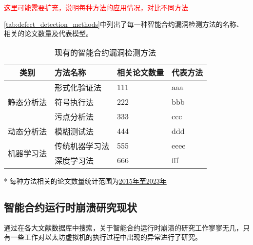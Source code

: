 \textcolor{red}{这里可能需要扩充，说明每种方法的应用情况，对比不同方法}

\autoref{tab:defect_detection_methods}中列出了每一种智能合约漏洞检测方法的名称、相关的论文数量及代表模型。

\begin{table}[htbp]
    \caption{\label{tab:defect_detection_methods}现有的智能合约漏洞检测方法}
    \small
    \begin{threeparttable}
        {
            \renewcommand{\arraystretch}{1.5}
        \begin{tabularx}{\linewidth}{cX<{\centering}X<{\centering}X<{\centering}}
            \toprule
            类别                     & 方法名称   & 相关论文数量 & 代表方法 \\ \midrule
            \multirow{3}{*}{静态分析法} & 形式化验证法 & 111    & aaa  \\
                                   & 符号执行法  & 222    & bbb  \\
                                   & 污点分析法  & 333    & ccc  \\ \midrule
            动态分析法                  & 模糊测试法  & 444    & ddd  \\ \midrule
            \multirow{2}{*}{机器学习法} & 传统机器学习法  & 555    & eeee \\
                                   & 深度学习法  & 666    & fff  \\ \bottomrule
        \end{tabularx}
        }
        \begin{tablenotes}
            \footnotesize
            \item[*] 每种方法相关的论文数量统计范围为\underline{2015年至2023年}
        \end{tablenotes}
    \end{threeparttable}
\end{table}

\subsection{智能合约运行时崩溃研究现状}
通过在各大文献数据库中搜索，关于智能合约运行时崩溃的研究工作寥寥无几，只有一些工作对以太坊虚拟机的执行过程中出现的异常进行了研究。



